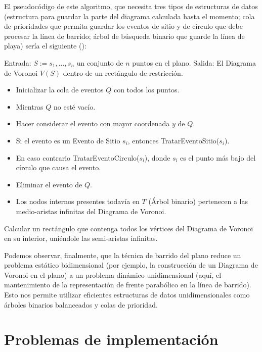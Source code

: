 El pseudocódigo de este algoritmo, que necesita tres tipos de estructuras de datos (estructura para guardar la parte del diagrama calculada hasta el momento; cola de prioridades que permita guardar los eventos de sitio y de círculo que debe procesar la línea de barrido; árbol de búsqueda binario que guarde la línea de playa) sería el siguiente (\cite{fotosfortune}):


    Entrada: $S:={s_{1},...,s_{n}}$ un conjunto de $n$ puntos en el plano.
    Salida: El Diagrama de Voronoi $V(S)$ dentro de un rectángulo de restricción.
    
    \begin{itemize}
        \item Inicializar la cola de eventos $Q$ con todos los puntos.
        \item Mientras $Q$ no esté vacío.
        \item Hacer considerar el evento con mayor coordenada $y$ de $Q$.
        \item Si el evento es un Evento de Sitio $s_{i}$,
            entonces TratarEventoSitio($s_{i}$).
        \item En caso contrario TratarEventoCirculo($s_{l}$), donde $s_{l}$ es el punto más bajo del círculo que causa el evento.
        \item Eliminar el evento de $Q$.
        \item Los nodos internos presentes todavía en $T$ (Árbol binario) pertenecen a las medio-aristas infinitas del Diagrama de Voronoi.
    \end{itemize}
    
    Calcular un rectángulo que contenga todos los vértices del Diagrama de Voronoi en su interior, uniéndole las semi-aristas infinitas.

\vspace{0.3cm}

Podemos observar, finalmente, que la técnica de barrido del plano reduce un problema estático bidimensional (por ejemplo, la construcción de un Diagrama de Voronoi en el plano) a un problema dinámico unidimensional (aquí, el mantenimiento de la representación de frente parabólico en la línea de barrido). Esto nos permite utilizar eficientes estructuras de datos unidimensionales como árboles binarios balanceados y colas de prioridad.


\section{Problemas de implementación}

